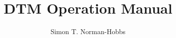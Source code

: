 \documentclass{manual}
\begin{document}
\title{DTM Operation Manual }
\author{Simon T. Norman-Hobbs}
\def\logoName{images/DEAPLogoFinal.pdf}
\def\edition{Rev. 1.1}
\def\secTitle{\textbf{D}igitizer $\&$ \\ \textbf{T}rigger \\ \textbf{M}odule}
\titleGM
\makeDescriptPage

%

\begin{frontmatter}

\tableofcontents
\clearpage
\listoffigures
\clearpage
\printglossary[title=Table of Symbols $\&$ Daqronyms]


\end{frontmatter}
\pagestyle{headings}




%



\nocite{*}
\printbibliography
\end{document}
